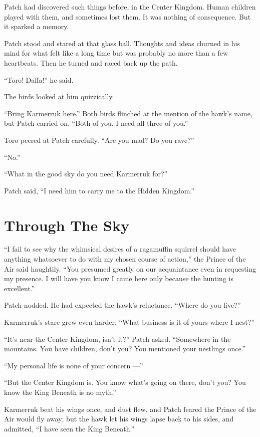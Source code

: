 \documentclass[12pt]{memoir}
\begin{document}
Patch had discovered such things before, in the Center Kingdom. Human
children played with them, and sometimes lost them. It was nothing of
consequence. But it sparked a memory.

Patch stood and stared at that glass ball. Thoughts and ideas churned
in his mind for what felt like a long time but was probably no more
than a few heartbeats. Then he turned and raced back up the path.

“Toro! Daffa!” he said.

The birds looked at him quizzically.

“Bring Karmerruk here.” Both birds flinched at the mention of the
hawk’s name, but Patch carried on. “Both of you. I need all three of
you.”

Toro peered at Patch carefully. “Are you mad? Do you rave?”

“No.”

“What in the good sky do you need Karmerruk for?”

Patch said, “I need him to carry me to the Hidden Kingdom.”


\section{Through The Sky}

“I fail to see why the whimsical desires of a ragamuffin squirrel
should have anything whatsoever to do with my chosen course of
action,” the Prince of the Air said haughtily. “You presumed greatly
on our acquaintance even in requesting my presence. I will have you
know I came here only because the hunting is excellent.”

Patch nodded. He had expected the hawk’s reluctance. “Where do you
live?”

Karmerruk’s stare grew even harder. “What business is it of yours
where I nest?”

“It’s near the Center Kingdom, isn’t it?” Patch asked. “Somewhere in
the mountains. You have children, don’t you? You mentioned your
nestlings once.”

“My personal life is none of your concern —”

“But the Center Kingdom is. You know what’s going on there, don’t you?
You know the King Beneath is no myth.”

Karmerruk beat his wings once, and dust flew, and Patch feared the
Prince of the Air would fly away; but the hawk let his wings lapse
back to his sides, and admitted, “I have seen the King Beneath.”
\end{document}
